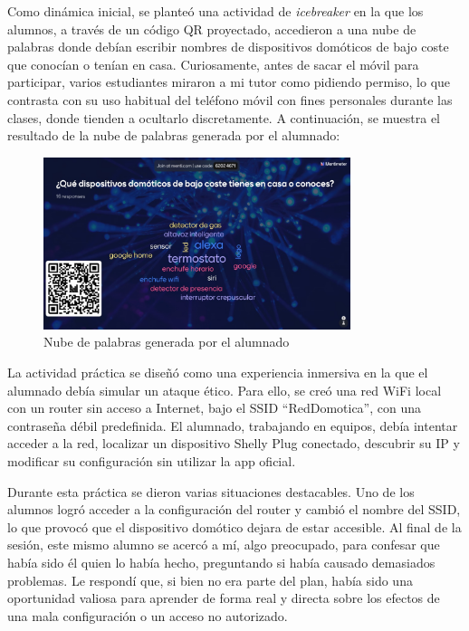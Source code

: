 Como dinámica inicial, se planteó una actividad de \textit{icebreaker} en la que los alumnos, a través de un código QR proyectado, accedieron a una nube de palabras donde debían escribir nombres de dispositivos domóticos de bajo coste que conocían o tenían en casa. Curiosamente, antes de sacar el móvil para participar, varios estudiantes miraron a mi tutor como pidiendo permiso, lo que contrasta con su uso habitual del teléfono móvil con fines personales durante las clases, donde tienden a ocultarlo discretamente. A continuación, se muestra el resultado de la nube de palabras generada por el alumnado:
\begin{figure}[H]
  \centering
  \includegraphics[width=0.8\textwidth]{resources/nube.jpg}
  \caption{Nube de palabras generada por el alumnado}
  \label{fig:nube_palabras}
\end{figure}

La actividad práctica se diseñó como una experiencia inmersiva en la que el alumnado debía simular un ataque ético. Para ello, se creó una red WiFi local con un router sin acceso a Internet, bajo el SSID “RedDomotica”, con una contraseña débil predefinida. El alumnado, trabajando en equipos, debía intentar acceder a la red, localizar un dispositivo Shelly Plug conectado, descubrir su IP y modificar su configuración sin utilizar la app oficial. 

Durante esta práctica se dieron varias situaciones destacables. Uno de los alumnos logró acceder a la configuración del router y cambió el nombre del SSID, lo que provocó que el dispositivo domótico dejara de estar accesible. Al final de la sesión, este mismo alumno se acercó a mí, algo preocupado, para confesar que había sido él quien lo había hecho, preguntando si había causado demasiados problemas. Le respondí que, si bien no era parte del plan, había sido una oportunidad valiosa para aprender de forma real y directa sobre los efectos de una mala configuración o un acceso no autorizado. 

